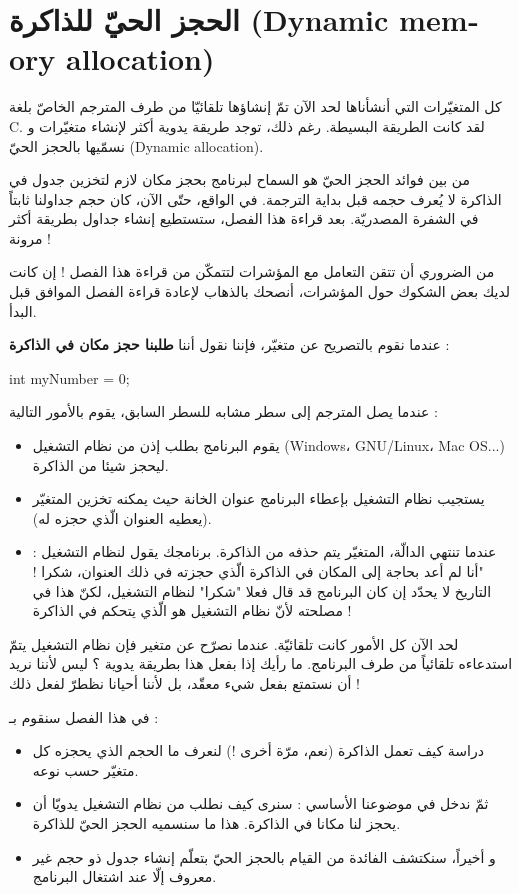 \chapter{الحجز الحيّ للذاكرة
(\textenglish{Dynamic memory allocation})}

كل المتغيّرات التي أنشأناها لحد الآن تمّ إنشاؤها تلقائيّا من طرف المترجم الخاصّ بلغة
\textenglish{C}.
لقد كانت الطريقة البسيطة. رغم ذلك، توجد طريقة يدوية أكثر لإنشاء متغيّرات و نسمّيها بالحجز الحيّ
(\textenglish{Dynamic allocation}).

من بين فوائد الحجز الحيّ هو السماح لبرنامج بحجز مكان لازم لتخزين جدول في الذاكرة لا يُعرف حجمه قبل بداية الترجمة. في الواقع، حتّى الآن، كان حجم جداولنا ثابتاً في الشفرة المصدريّة. بعد قراءة هذا الفصل، ستستطيع إنشاء جداول بطريقة أكثر مرونة !

من الضروري أن تتقن التعامل مع المؤشرات لتتمكّن من قراءة هذا الفصل ! إن كانت لديك بعض الشكوك حول المؤشرات، أنصحك بالذهاب لإعادة قراءة الفصل الموافق قبل البدأ.

عندما نقوم بالتصريح عن متغيّر، فإننا نقول أننا
\textbf{طلبنا حجز مكان في الذاكرة} :

\begin{Csource}
int myNumber = 0;
\end{Csource}

عندما يصل المترجم إلى سطر مشابه للسطر السابق، يقوم بالأمور التالية :
\begin{itemize}
  \item يقوم البرنامج بطلب إذن من نظام التشغيل
(\textenglish{Windows}، \textenglish{GNU/Linux}، \textenglish{Mac OS}...)
ليحجز شيئا من الذاكرة.
  \item يستجيب نظام التشغيل بإعطاء البرنامج عنوان الخانة حيث يمكنه تخزين المتغيّر (يعطيه العنوان الّذي حجزه له).
  \item عندما تنتهي الدالّة، المتغيّر يتم حذفه من الذاكرة. برنامجك يقول لنظام التشغيل : "أنا لم أعد بحاجة إلى المكان في الذاكرة الّذي حجزته في ذلك العنوان، شكرا ! التاريخ لا يحدّد إن كان البرنامج قد قال فعلا "شكرا" لنظام التشغيل، لكنّ هذا في مصلحته لأنّ نظام التشغيل هو الّذي يتحكم في الذاكرة !
\end{itemize}

لحد الآن كل الأمور كانت تلقائيّة. عندما نصرّح عن متغير فإن نظام التشغيل يتمّ استدعاءه تلقائياً من طرف البرنامج.
ما رأيك إذا بفعل هذا بطريقة يدوية ؟ ليس لأننا نريد أن نستمتع بفعل شيء معقّد، بل لأننا أحيانا نظطرّ لفعل ذلك !

في هذا الفصل سنقوم بـ :
\begin{itemize}
  \item دراسة كيف تعمل الذاكرة (نعم، مرّة أخرى !) لنعرف ما الحجم الذي يحجزه كل متغيّر حسب نوعه.
  \item ثمّ ندخل في موضوعنا الأساسي : سنرى كيف نطلب من نظام التشغيل يدويّا أن يحجز لنا مكانا في الذاكرة. هذا ما سنسميه الحجز الحيّ للذاكرة.
  \item و أخيراً، سنكتشف الفائدة من القيام بالحجز الحيّ بتعلّم إنشاء جدول ذو حجم غير معروف إلّا عند اشتغال البرنامج.
\end{itemize}

